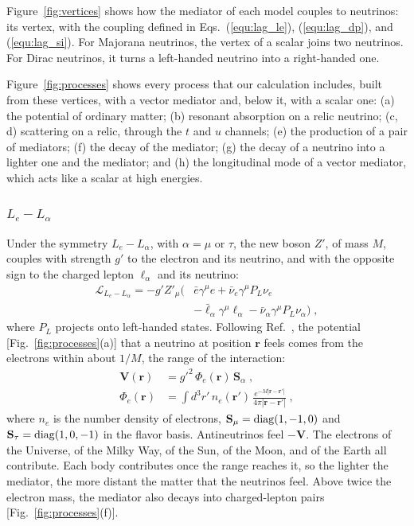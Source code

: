 \documentclass[linenumbers, aps, prd, twocolumn, superscriptaddress, floatfix, longbibliography, nofootinbib, bibnotes]{revtex4-2}
\begin{document}
Figure~\ref{fig:vertices} shows how the mediator of each model couples to neutrinos: its vertex, with the coupling defined in Eqs.~(\ref{equ:lag_le}), (\ref{equ:lag_dp}), and (\ref{equ:lag_si}).
For Majorana neutrinos, the vertex of a scalar joins two neutrinos.
For Dirac neutrinos, it turns a left-handed neutrino into a right-handed one.

Figure~\ref{fig:processes} shows every process that our calculation includes, built from these vertices, with a vector mediator and, below it, with a scalar one: (a) the potential of ordinary matter; (b) resonant absorption on a relic neutrino; (c, d) scattering on a relic, through the $t$ and $u$ channels; (e) the production of a pair of mediators; (f) the decay of the mediator; (g) the decay of a neutrino into a lighter one and the mediator; and (h) the longitudinal mode of a vector mediator, which acts like a scalar at high energies.

\subsubsection{\texorpdfstring{$L_e - L_\alpha$}{Le - Lalpha}}
Under the symmetry $L_e - L_\alpha$, with $\alpha = \mu$ or $\tau$, the new boson $Z'$, of mass $M$, couples with strength $g'$ to the electron and its neutrino, and with the opposite sign to the charged lepton $\ell_\alpha$ and its neutrino:
\begin{equation}
 \label{equ:lag_le}
 \begin{split}
 \mathcal{L}_{L_e - L_\alpha} = -g' Z'_\mu \big( & \bar e \gamma^\mu e + \bar\nu_e \gamma^\mu P_L \nu_e \\
  & - \bar\ell_\alpha \gamma^\mu \ell_\alpha - \bar\nu_\alpha \gamma^\mu P_L \nu_\alpha \big) \;,
 \end{split}
\end{equation}
where $P_L$ projects onto left-handed states.
Following Ref.~\cite{Agarwalla:2023sng}, the potential [Fig.~\ref{fig:processes}(a)] that a neutrino at position $\mathbf{r}$ feels comes from the electrons within about $1/M$, the range of the interaction:
\begin{equation}
 \label{equ:potential}
 \begin{split}
 \mathbf{V}(\mathbf{r}) &= g'^2\, \Phi_e(\mathbf{r})\, \mathbf{S}_\alpha \;, \\
 \Phi_e(\mathbf{r}) &= \int d^3 r'\, n_e(\mathbf{r}')\, \frac{e^{-M |\mathbf{r} - \mathbf{r}'|}}{4\pi |\mathbf{r} - \mathbf{r}'|} \;,
 \end{split}
\end{equation}
where $n_e$ is the number density of electrons, $\mathbf{S}_\mu = {\rm diag}(1, -1, 0)$ and $\mathbf{S}_\tau = {\rm diag}(1, 0, -1)$ in the flavor basis.
Antineutrinos feel $-\mathbf{V}$.
The electrons of the Universe, of the Milky Way, of the Sun, of the Moon, and of the Earth all contribute.
Each body contributes once the range reaches it, so the lighter the mediator, the more distant the matter that the neutrinos feel.
Above twice the electron mass, the mediator also decays into charged-lepton pairs [Fig.~\ref{fig:processes}(f)].
\end{document}
